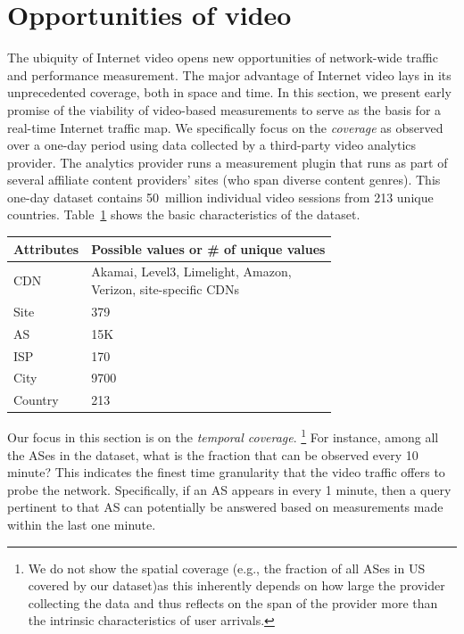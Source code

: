 

\section{Opportunities of video}
\label{sec:video}



The ubiquity of Internet video opens new opportunities of network-wide traffic
and performance measurement.  The major advantage of Internet video lays in its
unprecedented coverage, both in space and time.  In this section, we present
early promise of the viability of video-based measurements to serve as the
basis for a real-time Internet traffic map.  We specifically focus on the {\em
coverage}  as observed over a  one-day period using data collected by a
third-party video analytics provider. The analytics provider runs a measurement
plugin that runs as part of several affiliate content providers' sites (who
span diverse content genres). This one-day dataset  contains 50~million
individual video sessions from 213 unique countries.
Table~\ref{tab:overview:statistics} shows the basic characteristics of the
dataset. 

\begin{table}[h!]
    \begin{tabular}{|l|l|}
    \hline
    Attributes      &  Possible values or \# of unique values                      \\ \hline
    CDN  & \shortstack{Akamai, Level3, Limelight, Amazon, \\Verizon, site-specific CDNs}   \\ \hline
    Site  &  379 \\ \hline
    AS        & 15K                \\ \hline
    ISP       &  170                \\ \hline
    City & 9700                 \\     \hline
    Country & 213                 \\    \hline
    \end{tabular}
\label{tab:overview:statistics}
\end{table}

Our focus in this section is on the {\em  temporal coverage}. \footnote{We
do not show the  spatial coverage  (e.g., the fraction of all ASes
in US covered by our dataset)as this inherently depends on how large 
  the provider collecting the data and thus reflects on the span of the provider more 
than the intrinsic characteristics of user arrivals.}
 For instance,  among all the ASes in
the dataset, what is the fraction that can be observed every 10 minute? This
indicates the finest time granularity that the video traffic offers to probe the
network. Specifically,   if an AS appears in every 1 minute, then a query pertinent 
 to that AS can potentially 
be answered based on measurements made within the last one minute. 




